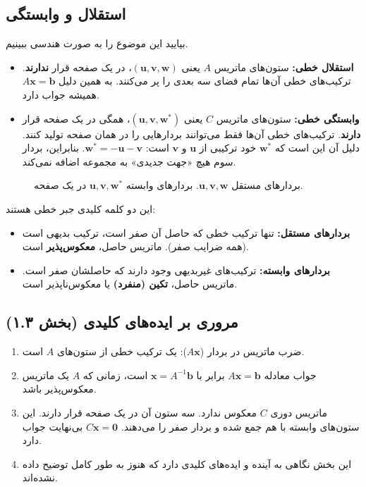 \documentclass[12pt, a4paper]{book}
\begin{document}
	\subsection*{استقلال و وابستگی}
	بیایید این موضوع را به صورت هندسی ببینیم.
	\begin{itemize}
		\item \textbf{استقلال خطی:} ستون‌های ماتریس $A$ یعنی $(\mathbf{u},\mathbf{v},\mathbf{w})$، در یک صفحه قرار \textbf{ندارند}. ترکیب‌های خطی آن‌ها تمام فضای سه بعدی را پر می‌کنند. به همین دلیل $A\mathbf{x}=\mathbf{b}$ همیشه جواب دارد.
		\item \textbf{وابستگی خطی:} ستون‌های ماتریس $C$ یعنی $(\mathbf{u},\mathbf{v},\mathbf{w}^*)$، همگی در یک صفحه قرار \textbf{دارند}. ترکیب‌های خطی آن‌ها فقط می‌توانند بردارهایی را در همان صفحه تولید کنند. دلیل آن این است که $\mathbf{w}^*$ خود ترکیبی از $\mathbf{u}$ و $\mathbf{v}$ است: $\mathbf{w}^* = -\mathbf{u}-\mathbf{v}$. بنابراین، بردار سوم هیچ «جهت جدیدی» به مجموعه اضافه نمی‌کند.
	\end{itemize}
	\begin{figure}[h!]
		\centering
		\caption{بردارهای مستقل $\mathbf{u},\mathbf{v},\mathbf{w}$. بردارهای وابسته $\mathbf{u},\mathbf{v},\mathbf{w}^*$ در یک صفحه.}
	\end{figure}
	این دو کلمه کلیدی جبر خطی هستند:
	\begin{itemize}
		\item \textbf{بردارهای مستقل:} تنها ترکیب خطی که حاصل آن صفر است، ترکیب بدیهی است (همه ضرایب صفر). ماتریس حاصل، \textbf{معکوس‌پذیر} است.
		\item \textbf{بردارهای وابسته:} ترکیب‌های غیربدیهی وجود دارند که حاصلشان صفر است. ماتریس حاصل، \textbf{تکین (منفرد)} یا معکوس‌ناپذیر است.
	\end{itemize}
	
	\newpage
	\subsection*{مروری بر ایده‌های کلیدی (بخش ۱.۳)}
	\begin{enumerate}
		\item ضرب ماتریس در بردار ($A\mathbf{x}$): یک ترکیب خطی از ستون‌های $A$ است.
		\item جواب معادله $A\mathbf{x}=\mathbf{b}$ برابر با $\mathbf{x}=A^{-1}\mathbf{b}$ است، زمانی که $A$ یک ماتریس معکوس‌پذیر باشد.
		\item ماتریس دوری $C$ معکوس ندارد. سه ستون آن در یک صفحه قرار دارند. این ستون‌های وابسته با هم جمع شده و بردار صفر را می‌دهند. $C\mathbf{x}=\mathbf{0}$ بی‌نهایت جواب دارد.
		\item این بخش نگاهی به آینده و ایده‌های کلیدی دارد که هنوز به طور کامل توضیح داده نشده‌اند.
	\end{enumerate}
	
\end{document}
